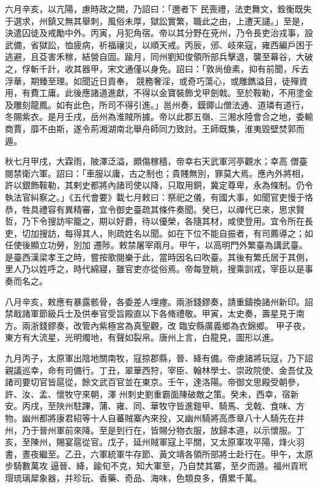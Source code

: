 \begin{pinyinscope}
 六月辛亥，以亢陽，慮時政之闕，乃詔曰：「邇者下
 民喪禮，法吏舞文，銓衡既失于選求，州鎮又無其舉刺，風俗未厚，獄訟實繁，職此之由，上遭天譴。」至是，決遣囚徒及戒勵中外。丙寅，月犯角宿。帝以其分野在兗州，乃令長吏治戎事，設武備，省獄訟，恤疲病，祈福禳災，以順天戒。丙辰，邠、岐來寇，雍西編戶困于逃避，且芟害禾稼，結營自固。踰月，同州劉知俊領所部兵擊退，襲至幕谷，大破之，俘斬千計，收其器甲，宋文通僅以身免。詔曰：「敦尚儉素，抑有前聞，斥去浮華，期臻至理。如聞近日貢奉，
 競務奢淫，或奇巧蕩心，或雕鐫溢目，徒殫資用，有費工庸。此後應諸道進獻，不得以金寶裝飾戈甲劍戟。至於鞍勒，不用塗金及雕刻龍鳳。如有此色，所司不得引進。」邕州奏，鏌鎁山僧法通、道璘有道行，冬賜紫衣。是月壬戌，岳州為淮賊所據。帝以此郡五嶺、三湘水陸會合之地，委輸商賈，靡不由斯，遂令荊湘湖南北舉舟師同力致討。王師既集，淮夷毀壁焚郭而遁。



 秋七月甲戌，大霖雨，陂澤泛溢，頗傷稼穡，帝幸右天武軍河亭觀水；幸高
 僧臺閱禁衛六軍。詔曰：「車服以庸，古之制也；貴賤無別，罪莫大焉。應內外將相，許以銀飾鞍勒，其剌史都將內諸司使以降，只取用銅，冀定尊卑，永為條制。仍令執法官糾察之。」《五代會要》載七月敕曰：祭祀之儀，有國大事，如聞官吏慢于恪恭，牲具禮容有異精審，宜令御史臺疏其條件奏聞。癸巳，以禪代已來，思求賢哲，乃下令搜訪牢籠之，期以好爵，待以優榮，各隨其材，咸使登用。宜令所在長吏，切加搜訪，每得其人，則疏姓名以聞。如在下位不能自振者，有司薦導之；如任使後顯立功勞，別加
 遷陟。敕禁屠宰兩月。甲午，以高明門外繁臺為講武臺。是臺西漢梁孝王之時，嘗按歌閱樂于此，當時因名曰吹臺。其後有繁氏居于其側，里人乃以姓呼之，時代綿寢，雖官吏亦從俗焉。帝每登眺，搜乘訓戎，宰臣以是事奏而名之。


八月辛亥，敕應有暴露骸骨，各委差人埋瘞。兩浙錢鏐奏，請重鑄換諸州新印。詔禁戢諸軍節級兵士及供奉官受旨殿直以下各脩禮敬。甲寅，太史奏，壽星見于南方。兩浙錢鏐奏，改管內紫極宮為真聖觀，改
 臨安縣廣義鄉為衣錦鄉。
 甲子夜，東方有大流星，光明燭地，有聲如裂帛。唐州上言，白龍見，圖形以進。



 九月丙子，太原軍出陰地關南牧，寇掠郡縣，晉、絳有備。帝慮諸將玩寇，乃下詔親議巡幸，命有司備行。丁丑，翠華西狩，宰臣、翰林學士、崇政院使、金吾仗及諸司要切官皆扈從，餘文武百官並在東京。壬午，達洛陽。帝御文思殿受朝參，許、汝、孟、懷牧守來朝，澤
 州刺史劉重霸面陳破敵之策。癸未，西幸，宿新安。丙戌，至陜州駐蹕，蒲、雍、同、華牧守皆進鎧甲、騎馬、戈戟、食味、方物。幽州都將康君紹等十人自蕃賊寨內來投，又幽州騎將高彥章八十人騎先在并州，乃于晉州軍前來降。至是到行在，皆賜分物衣服，放歸本道，以示懷服。丁亥，至陳州，賜宴扈從官。戊子，延州賊軍寇上平關，又太原軍攻平陽，烽火羽書，晝夜繼至。乙丑，六軍統軍牛存節、黃文靖各領所部將士赴行在。甲午，太原步騎數萬攻
 逼晉、絳，踰旬不克，知大軍至，乃自焚其寨，至夕而遁。福州貢玳瑁琉璃犀象器，并珍玩、香藥、奇品、海味，色類良多，價累千萬。




\end{pinyinscope}
